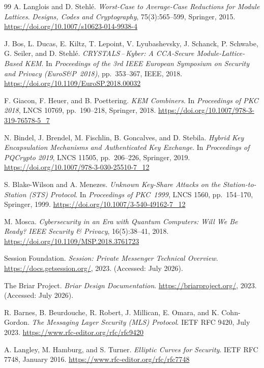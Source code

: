 \documentclass[11pt,a4paper]{article}
\theoremstyle{remark}
\theoremstyle{plain}
\begin{document}
\begin{thebibliography}{99}
A. Langlois and D. Stehl\'{e}.
\emph{Worst-Case to Average-Case Reductions for Module Lattices}.
\emph{Designs, Codes and Cryptography}, 75(3):565--599, Springer, 2015.
\url{https://doi.org/10.1007/s10623-014-9938-4}

J. Bos, L. Ducas, E. Kiltz, T. Lepoint, V. Lyubashevsky, J. Schanck, P. Schwabe, G. Seiler,
and D. Stehl\'e.
\emph{CRYSTALS\,--\,Kyber: A CCA-Secure Module-Lattice-Based KEM}.
In \emph{Proceedings of the 3rd IEEE European Symposium on Security and Privacy (EuroS\&P~2018)},
pp.~353--367, IEEE, 2018.
\url{https://doi.org/10.1109/EuroSP.2018.00032}

F. Giacon, F. Heuer, and B. Poettering.
\emph{KEM Combiners}.
In \emph{Proceedings of PKC 2018}, LNCS 10769, pp.~190--218, Springer, 2018.
\url{https://doi.org/10.1007/978-3-319-76578-5_7}

N. Bindel, J. Brendel, M. Fischlin, B. Goncalves, and D. Stebila.
\emph{Hybrid Key Encapsulation Mechanisms and Authenticated Key Exchange}.
In \emph{Proceedings of PQCrypto 2019}, LNCS 11505, pp.~206--226, Springer, 2019.
\url{https://doi.org/10.1007/978-3-030-25510-7_12}

S. Blake-Wilson and A. Menezes.
\emph{Unknown Key-Share Attacks on the Station-to-Station (STS) Protocol}.
In \emph{Proceedings of PKC~1999}, LNCS 1560, pp.~154--170, Springer, 1999.
\url{https://doi.org/10.1007/3-540-49162-7_12}

M. Mosca.
\emph{Cybersecurity in an Era with Quantum Computers: Will We Be Ready?}
\emph{IEEE Security \& Privacy}, 16(5):38--41, 2018.
\url{https://doi.org/10.1109/MSP.2018.3761723}

Session Foundation.
\emph{Session: Private Messenger Technical Overview}.
\url{https://docs.getsession.org/}, 2023. (Accessed: July 2026).

The Briar Project.
\emph{Briar Design Documentation}.
\url{https://briarproject.org/}, 2023. (Accessed: July 2026).

R. Barnes, B. Beurdouche, R. Robert, J. Millican, E. Omara, and K. Cohn-Gordon.
\emph{The Messaging Layer Security (MLS) Protocol}.
IETF RFC 9420, July 2023.
\url{https://www.rfc-editor.org/rfc/rfc9420}

A. Langley, M. Hamburg, and S. Turner.
\emph{Elliptic Curves for Security}.
IETF RFC 7748, January 2016.
\url{https://www.rfc-editor.org/rfc/rfc7748}


\end{thebibliography}
\end{document}
